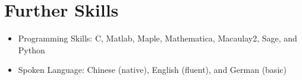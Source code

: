 \documentclass[a4paper,12pt]{article}
\begin{document}
\section*{\Large{Further Skills}}
\begin{itemize}
 \item Programming Skills: C, Matlab, Maple, Mathematica, Macaulay2, Sage, and Python
 \item Spoken Language: Chinese (native), English (fluent), and German (basic)
\end{itemize}


%
%
%
\end{document}
